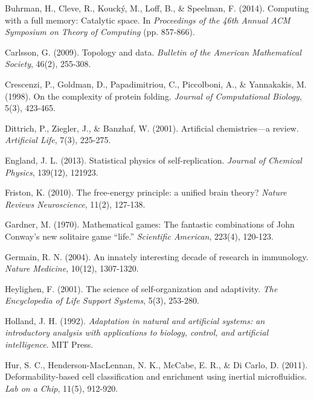 \documentclass[11pt]{article}
\begin{document}
\begin{thebibliography}{99}
Buhrman, H., Cleve, R., Koucký, M., Loff, B., \& Speelman, F. (2014).
\newblock Computing with a full memory: Catalytic space.
\newblock In \textit{Proceedings of the 46th Annual ACM Symposium on Theory of Computing} (pp. 857-866).

Carlsson, G. (2009).
\newblock Topology and data.
\newblock \textit{Bulletin of the American Mathematical Society}, 46(2), 255-308.

Crescenzi, P., Goldman, D., Papadimitriou, C., Piccolboni, A., \& Yannakakis, M. (1998).
\newblock On the complexity of protein folding.
\newblock \textit{Journal of Computational Biology}, 5(3), 423-465.

Dittrich, P., Ziegler, J., \& Banzhaf, W. (2001).
\newblock Artificial chemistries—a review.
\newblock \textit{Artificial Life}, 7(3), 225-275.

England, J. L. (2013).
\newblock Statistical physics of self-replication.
\newblock \textit{Journal of Chemical Physics}, 139(12), 121923.

Friston, K. (2010).
\newblock The free-energy principle: a unified brain theory?
\newblock \textit{Nature Reviews Neuroscience}, 11(2), 127-138.

Gardner, M. (1970).
\newblock Mathematical games: The fantastic combinations of John Conway's new solitaire game ``life.''
\newblock \textit{Scientific American}, 223(4), 120-123.

Germain, R. N. (2004).
\newblock An innately interesting decade of research in immunology.
\newblock \textit{Nature Medicine}, 10(12), 1307-1320.

Heylighen, F. (2001).
\newblock The science of self-organization and adaptivity.
\newblock \textit{The Encyclopedia of Life Support Systems}, 5(3), 253-280.

Holland, J. H. (1992).
\newblock \textit{Adaptation in natural and artificial systems: an introductory analysis with applications to biology, control, and artificial intelligence}.
\newblock MIT Press.

Hur, S. C., Henderson-MacLennan, N. K., McCabe, E. R., \& Di Carlo, D. (2011).
\newblock Deformability-based cell classification and enrichment using inertial microfluidics.
\newblock \textit{Lab on a Chip}, 11(5), 912-920.


\end{thebibliography}
\end{document}
